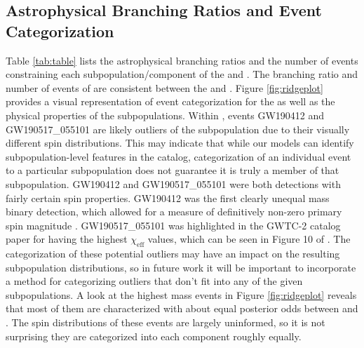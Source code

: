 \subsection{Astrophysical Branching Ratios and Event Categorization}

Table \ref{tab:table} lists the astrophysical branching ratios and the number of events constraining each subpopulation/component of the \base{} and \comp{}. The branching ratio and number of events of \first{} are consistent between the \base{} and \comp{}. Figure \ref{fig:ridgeplot} provides a visual representation of event categorization for the \comp{} as well as the physical properties of the subpopulations. Within \contA{}, events GW190412 and GW190517\_055101 are likely outliers of the subpopulation due to their visually different spin distributions. This may indicate that while our models can identify subpopulation-level features in the catalog, categorization of an individual event to a particular subpopulation does not guarantee it is truly a member of that subpopulation. GW190412 and GW190517\_055101 were both detections with fairly certain spin properties. GW190412 was the first clearly unequal mass binary detection, which allowed for a measure of definitively non-zero primary spin magnitude \citep{10.3847/2041-8213/aba8ef, 2010.14527}. GW190517\_055101 was highlighted in the GWTC-2 catalog paper \citet{2010.14527} for having the highest $\chi_\text{eff}$ values, which can be seen in Figure 10 of \citet{2010.14527}. The categorization of these potential outliers may have an impact on the resulting subpopulation distributions, so in future work it will be important to incorporate a method for categorizing outliers that don't fit into any of the given subpopulations. A look at the highest mass events in Figure \ref{fig:ridgeplot} reveals that most of them are characterized with about equal posterior odds between \contA{} and \contB{}. The spin distributions of these events are largely uninformed, so it is not surprising they are categorized into each component roughly equally. 


